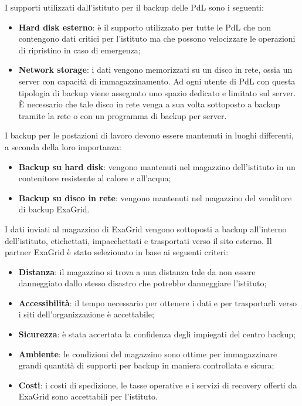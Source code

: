 \documentclass[12pt, a4paper, titlepage]{report}
\newcommand{\backupVendor}{ExaGrid} %
\begin{document}
	I supporti utilizzati dall'istituto per il backup delle PdL sono i seguenti:
	\begin{itemize}
		\item \textbf{Hard disk esterno}: è il supporto utilizzato per tutte le PdL che non contengono dati critici per l'istituto ma che possono velocizzare le operazioni di ripristino in caso di emergenza;
		\item \textbf{Network storage}: i dati vengono memorizzati su un disco in rete, ossia un server con capacità di immagazzinamento. Ad ogni utente di PdL con questa tipologia di backup viene assegnato uno spazio dedicato e limitato sul server. È necessario che tale disco in rete venga a sua volta sottoposto a backup tramite la rete o con un programma di backup per server.
	\end{itemize}
	I backup per le postazioni di lavoro devono essere mantenuti in luoghi differenti, a seconda della loro importanza:
	\begin{itemize}
		\item \textbf{Backup su hard disk}: vengono mantenuti nel magazzino dell'istituto in un contenitore resistente al calore e all'acqua;
		\item \textbf{Backup su disco in rete}: vengono mantenuti nel magazzino del venditore di backup \backupVendor.
	\end{itemize}
	I dati inviati al magazzino di \backupVendor{} vengono sottoposti a backup all'interno dell'istituto, etichettati, impacchettati e trasportati verso il sito esterno. Il partner \backupVendor{} è stato selezionato in base ai seguenti criteri:
	\begin{itemize}
		\item \textbf{Distanza}: il magazzino si trova a una distanza tale da non essere danneggiato dallo stesso disastro che potrebbe danneggiare l'istituto;
		\item \textbf{Accessibilità}: il tempo necessario per ottenere i dati e per trasportarli verso i siti dell'organizzazione è accettabile;
		\item \textbf{Sicurezza}: è stata accertata la confidenza degli impiegati del centro backup;
		\item \textbf{Ambiente}: le condizioni del magazzino sono ottime per immagazzinare grandi quantità di supporti per backup in maniera controllata e sicura;
		\item \textbf{Costi}: i costi di spedizione, le tasse operative e i servizi di recovery offerti da \backupVendor{} sono accettabili per l'istituto.
	\end{itemize}
	
\end{document}
